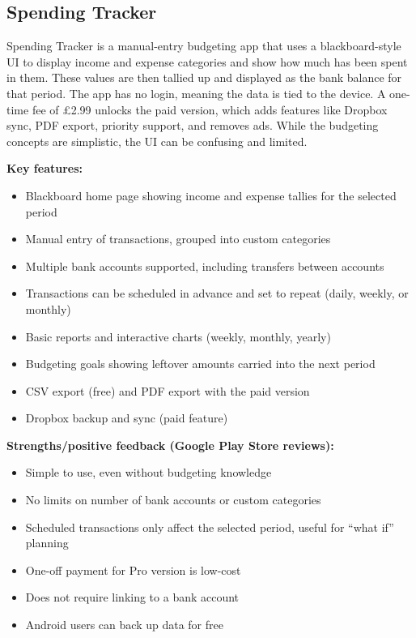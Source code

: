 \documentclass{l4proj}
\begin{document}
\begin{appendices}
\section{Spending Tracker}

Spending Tracker is a manual-entry budgeting app that uses a blackboard-style UI to display income and expense categories and show how much has been spent in them. These values are then tallied up and displayed as the bank balance for that period. The app has no login, meaning the data is tied to the device. A one-time fee of £2.99 unlocks the paid version, which adds features like Dropbox sync, PDF export, priority support, and removes ads. While the budgeting concepts are simplistic, the UI can be confusing and limited.

\vspace{0.5em}
\textbf{Key features:}
\begin{itemize}
    \item Blackboard home page showing income and expense tallies for the selected period
    \item Manual entry of transactions, grouped into custom categories
    \item Multiple bank accounts supported, including transfers between accounts
    \item Transactions can be scheduled in advance and set to repeat (daily, weekly, or monthly)
    \item Basic reports and interactive charts (weekly, monthly, yearly)
    \item Budgeting goals showing leftover amounts carried into the next period
    \item CSV export (free) and PDF export with the paid version
    \item Dropbox backup and sync (paid feature)
\end{itemize}
\vspace{0.5em}

\textbf{Strengths/positive feedback (Google Play Store reviews):}
\begin{itemize}
    \item Simple to use, even without budgeting knowledge
    \item No limits on number of bank accounts or custom categories
    \item Scheduled transactions only affect the selected period, useful for “what if” planning
    \item One-off payment for Pro version is low-cost
    \item Does not require linking to a bank account
    \item Android users can back up data for free
\end{itemize}
\vspace{0.5em}


\end{appendices}
\end{document}
